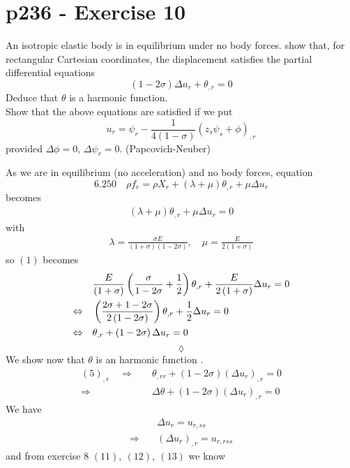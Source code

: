 \section{p236 - Exercise 10}
\begin{tcolorbox}
An isotropic elastic body is in equilibrium under no body forces. show that, for rectangular Cartesian coordinates, the displacement satisfies the partial differential equations
$$\left(1-2\sigma\right)\Delta u_r+\theta_{,r}=0$$
Deduce that $\theta$ is a harmonic function.\\
Show that the above equations are satisfied if we put 
$$u_r=\psi_r-\frac{1}{4\left(1-\sigma\right)}\left(z_s\psi_s+\phi\right)_{,r}$$
provided $\Delta\phi=0$, $\Delta\psi_r=0$. (Papcovich-Neuber)
\end{tcolorbox}
As we are in equilibrium (no acceleration) and no body forces, equation $$\mathbf{6.250}\quad \rho f_r = \rho X_r + \left(\lambda+\mu\right)\theta_{,r} + \mu\Delta u_r$$ becomes
\begin{align}
\left(\lambda+\mu\right)\theta_{,r} + \mu\Delta u_r = 0
\end{align}
with 
\begin{align}
\lambda= \frac{\sigma E}{\left(1+\sigma\right)\left(1-2\sigma\right)}, \quad \mu= \frac{ E}{2\left(1+\sigma\right)}
\end{align}
so $(1)$ becomes 
\begin{align}
&\frac{E}{\left(1+\sigma\right)}\left(\frac{\sigma }{1-2\sigma}+\frac{1}{2}\right)\theta_{,r} + \frac{ E}{2\left(1+\sigma\right)}\Delta u_r = 0\\
\Leftrightarrow\quad & \left(\frac{2\sigma +1-2\sigma}{2\left(1-2\sigma\right)}\right)\theta_{,r}+\frac{1}{2}\Delta u_r = 0\\
\Leftrightarrow\quad & \theta_{,r}+\left(1-2\sigma\right)\Delta u_r = 0
\end{align}
$$\lozenge$$
We show now that $\theta$ is an harmonic function .
\begin{align}
(5)_{,r}\quad\Rightarrow\quad & \theta_{,rr}+\left(1-2\sigma\right)\left(\Delta u_r\right)_{,r} = 0\\
\Rightarrow\quad &\Delta \theta+\left(1-2\sigma\right)\left(\Delta u_r\right)_{,r} = 0
\end{align}
We have 
\begin{align}
&\Delta u_r = u_{r,ss}\\
\Rightarrow\quad & \left(\Delta u_r\right)_{,r} = u_{r,rss}
\end{align}
and from exercise 8 $(11),\ (12),\ (13)$ we know 
